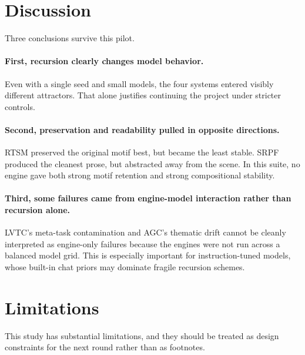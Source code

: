 \documentclass[11pt]{article}
\begin{document}
\section{Discussion}
Three conclusions survive this pilot.

\paragraph{First, recursion clearly changes model behavior.}
Even with a single seed and small models, the four systems entered visibly different attractors. That alone justifies continuing the project under stricter controls.

\paragraph{Second, preservation and readability pulled in opposite directions.}
RTSM preserved the original motif best, but became the least stable. SRPF produced the cleanest prose, but abstracted away from the scene. In this suite, no engine gave both strong motif retention and strong compositional stability.

\paragraph{Third, some failures came from engine-model interaction rather than recursion alone.}
LVTC's meta-task contamination and AGC's thematic drift cannot be cleanly interpreted as engine-only failures because the engines were not run across a balanced model grid. This is especially important for instruction-tuned models, whose built-in chat priors may dominate fragile recursion schemes.

\section{Limitations}
This study has substantial limitations, and they should be treated as design constraints for the next round rather than as footnotes.
\end{document}
